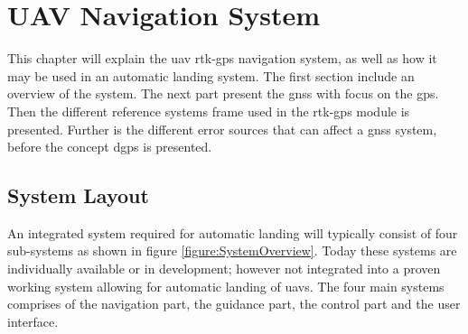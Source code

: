 
\chapter{UAV Navigation System}
This chapter will explain the \gls{uav} \acrfull{rtk-gps} navigation system, as well as how it may be used in an automatic landing system. The first section include an overview of the system.
The next part present the \acrfull{gnss} with focus on the \acrfull{gps}. Then the different reference systems frame used in the \gls{rtk-gps} module is presented. Further is the different error sources that can affect a \gls{gnss} system, before the concept \acrfull{dgps} is presented.
\section{System Layout}
An integrated system required for automatic landing will typically consist of four sub-systems as shown in figure \ref{figure:SystemOverview}. Today these systems are individually available or in development; however not integrated into a proven working system allowing for automatic landing of \glspl{uav}. The four main systems comprises of the navigation part, the guidance part, the control part and the user interface.

